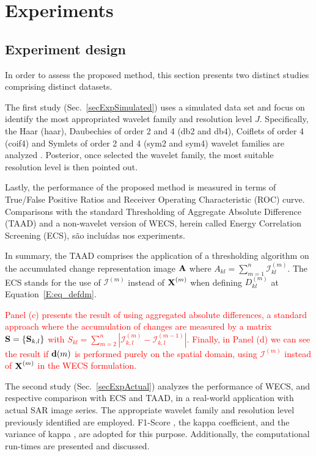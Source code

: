 \documentclass[journal]{IEEEtran}
\newcommand{\vA}{{\textbf A}}
\newcommand{\vd}{{\textbf d}}
\newcommand{\vS}{{\textbf S}}
\newcommand{\vX}{{\textbf X}}
\begin{document}
\section{Experiments}\label{secExperiments}

\subsection{Experiment design}\label{secExpDesign}

In order to assess the proposed method, this section presents two distinct studies comprising distinct datasets.

The first study (Sec.~\ref{secExpSimulated}) uses a simulated data set and focus on identify the most appropriated wavelet family and resolution level $J$. Specifically, the Haar (haar), Daubechies of order 2 and 4 (db2 and db4), Coiflets of order 4 (coif4) and Symlets of order 2 and 4 (sym2 and sym4) wavelet families are analyzed \cite{BeylkinEA1991,Daubechies1992}. 
Posterior, once selected the wavelet family, the most suitable resolution level is then pointed out.

Lastly, the performance of the proposed method is measured in terms of True/False Positive Ratios and Receiver Operating Characteristic (ROC) curve. 
Comparisons with the standard Thresholding of Aggregate Absolute Difference (TAAD) and a non-wavelet version of WECS, herein called Energy Correlation Screening (ECS), são incluídas nos experiments. 

In summary, the TAAD comprises the application of a thresholding algorithm on the accumulated change representation image $\vA$ where $A_{kl} = \sum_{m=1}^{n}\mathcal{I}_{kl}^{(m)}$. The ECS stands for the use of $\mathcal{I}^{(m)}$ instead of $\vX^{(m)}$ when defining $D_{kl}^{(m)}$ at Equation~\ref{E:eq_defdm}.


\textcolor{red}{
Panel (c) presents the result of using aggregated absolute differences, a standard approach where the accumulation of changes are measured by a matrix $\vS=\{\vS_{k,l}\}$ with $S_{kl} = \sum_{m=2}^n	|\mathcal{I}_{k,l}^{(m)} - \mathcal{I}_{k,l}^{(m-1)}|$. Finally, in Panel (d) we can see the result if $\vd(m)$ is performed purely on the spatial domain, using $\mathcal{I}^{(m)}$ instead of $\vX^{(m)}$ in the WECS formulation. 
}



The second study (Sec.~\ref{secExpActual}) analyzes the performance of WECS, and respective comparison with ECS and TAAD, in a real-world application with actual SAR image series. The appropriate wavelet family and resolution level previously identified are employed.
F1-Score \cite{Rijsbergen1979}, the kappa coefficient, and the variance of kappa \cite{Congalton2019}, are adopted for this purpose. Additionally, the computational run-times are presented and discussed. 
\end{document}
